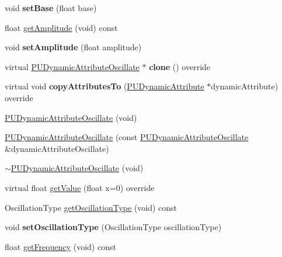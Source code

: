 \begin{DoxyCompactItemize}
void {\bfseries set\+Base} (float base)
\item 
float \hyperlink{classPUDynamicAttributeOscillate_a83a4b87f76219e555f94d677fda4160a}{get\+Amplitude} (void) const
\item 
\mbox{\label{classPUDynamicAttributeOscillate_a427a747c743679fdcbce42aeb78c8b1e}} 
void {\bfseries set\+Amplitude} (float amplitude)
\item 
\mbox{\label{classPUDynamicAttributeOscillate_ad480b00b232df1a8f51e012b6461da7a}} 
virtual \hyperlink{classPUDynamicAttributeOscillate}{P\+U\+Dynamic\+Attribute\+Oscillate} $\ast$ {\bfseries clone} () override
\item 
\mbox{\label{classPUDynamicAttributeOscillate_a73663a185280062d2a953db28f13e944}} 
virtual void {\bfseries copy\+Attributes\+To} (\hyperlink{classPUDynamicAttribute}{P\+U\+Dynamic\+Attribute} $\ast$dynamic\+Attribute) override
\item 
\hyperlink{classPUDynamicAttributeOscillate_a61d288747e43dd28f86d99cb20595043}{P\+U\+Dynamic\+Attribute\+Oscillate} (void)
\item 
\hyperlink{classPUDynamicAttributeOscillate_a63667f8e4d78ac81951fb5d050e2ed30}{P\+U\+Dynamic\+Attribute\+Oscillate} (const \hyperlink{classPUDynamicAttributeOscillate}{P\+U\+Dynamic\+Attribute\+Oscillate} \&dynamic\+Attribute\+Oscillate)
\item 
\hyperlink{classPUDynamicAttributeOscillate_a127238844b9c36e66e7a410961dc7dd8}{$\sim$\+P\+U\+Dynamic\+Attribute\+Oscillate} (void)
\item 
virtual float \hyperlink{classPUDynamicAttributeOscillate_aeb4b57af76effcaef69b5a305a7dd8a6}{get\+Value} (float x=0) override
\item 
Oscillation\+Type \hyperlink{classPUDynamicAttributeOscillate_a6a41d538fd4e41ea0a7a5937645dd1cb}{get\+Oscillation\+Type} (void) const
\item 
\mbox{\label{classPUDynamicAttributeOscillate_a551c0e6b24b46e162f005e01ff220445}} 
void {\bfseries set\+Oscillation\+Type} (Oscillation\+Type oscillation\+Type)
\item 
float \hyperlink{classPUDynamicAttributeOscillate_af8a1b226426bf7f180b62cb823af1594}{get\+Frequency} (void) const
\item 

\end{DoxyCompactItemize}
